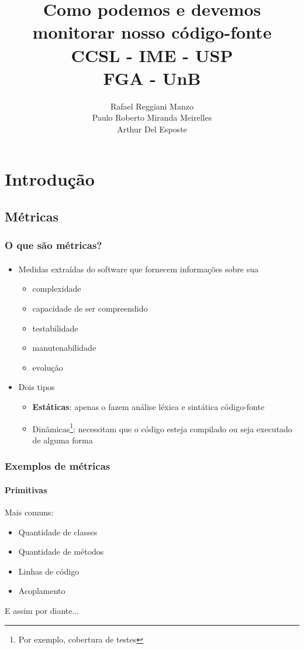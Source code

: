\documentclass{beamer}
\title{
       \textbf{Como podemos e devemos monitorar nosso código-fonte} \\
       CCSL - IME - USP\\
       FGA - UnB
      }
\author{
        Rafael Reggiani Manzo \\
        Paulo Roberto Miranda Meirelles \\
        Arthur Del Esposte
       }
\begin{document}
\maketitle

\section{Introdução}
  \subsection{Métricas}
  \begin{frame}
    \frametitle{O que são métricas?}
    \framesubtitle{}

    \begin{itemize}
      \item Medidas extraídas do software que fornecem informações sobre sua
        \begin{itemize}
          \item complexidade
          \item capacidade de ser compreendido
          \item testabilidade
          \item manutenabilidade
          \item evolução
        \end{itemize}
      \item Dois tipos
        \begin{itemize}
          \item \textbf{Estáticas}: apenas o fazem análise léxica e sintática código-fonte
          \item Dinâmicas\footnote{Por exemplo, cobertura de testes}: necessitam que o código esteja compilado ou seja executado de alguma forma
        \end{itemize}
    \end{itemize}
  \end{frame}

  \begin{frame}
    \frametitle{Exemplos de métricas}
    \framesubtitle{Primitivas}

    Mais comuns:
    \begin{itemize}
      \item Quantidade de classes
      \item Quantidade de métodos
      \item Linhas de código
      \item Acoplamento
    \end{itemize}

    E assim por diante...
  \end{frame}
\end{document}
